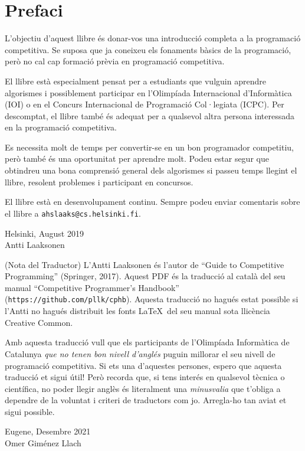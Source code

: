 \chapter*{Prefaci}
L'objectiu d'aquest llibre és donar-vos una introducció completa a la
programació competitiva. Se suposa que ja coneixeu els fonaments
bàsics de la programació, però no cal cap formació prèvia en
programació competitiva.

El llibre està especialment pensat per a estudiants que vulguin
aprendre algorismes i possiblement participar en l'Olimpíada
Internacional d'Informàtica (IOI) o en el Concurs Internacional de
Programació Col·legiata (ICPC). Per descomptat, el llibre també és
adequat per a qualsevol altra persona interessada en la programació
competitiva.

Es necessita molt de temps per convertir-se en un bon programador
competitiu, però també és una oportunitat per aprendre molt. Podeu
estar segur que obtindreu una bona comprensió general dels algorismes
si passeu temps llegint el llibre, resolent problemes i participant en
concursos.

El llibre està en desenvolupament continu. Sempre podeu enviar
comentaris sobre el llibre a \texttt{ahslaaks@cs.helsinki.fi}.

\begin{flushright}
Helsinki, August 2019 \\
Antti Laaksonen
\end{flushright}

\bigskip
\bigskip

(Nota del Traductor) L'Antti Laaksonen és l'autor de ``Guide to
Competitive Programming'' (Springer, 2017). Aquest PDF és la traducció
al català del seu manual ``Competitive Programmer's Handbook''
(\texttt{https://github.com/pllk/cphb}). Aquesta traducció no hagués
estat possible si l'Antti no hagués distribuit les fonts \LaTeX\ del
seu manual sota llicència Creative Common.

Amb aquesta traducció vull que els participants de l'Olimpíada
Informàtica de Catalunya \emph{que no tenen bon nivell d'anglés}
puguin millorar el seu nivell de programació competitiva. Si ets una
d'aquestes persones, espero que aquesta traducció et sigui útil! Però
recorda que, si tens interés en qualsevol tècnica o científica, no
poder llegir anglès és literalment una \emph{minusvalia} que t'obliga
a dependre de la voluntat i criteri de traductors com jo. Arregla-ho
tan aviat et sigui possible.

\begin{flushright}
Eugene, Desembre 2021 \\
Omer Giménez Llach
\end{flushright}

